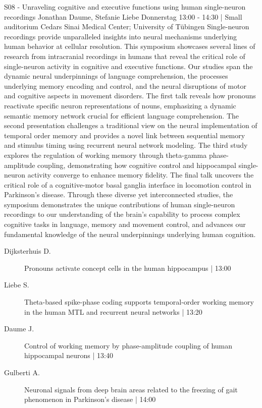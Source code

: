 
            \begin{symposium}
            {S08 - Unraveling cognitive and executive functions using human single-neuron recordings}
            {Jonathan Daume, Stefanie Liebe}
            {Donnerstag 13:00 - 14:30 | Small auditorium}
            {Cedars Sinai Medical Center; University of Tübingen}
            Single-neuron recordings provide unparalleled insights into neural mechanisms underlying human behavior at cellular resolution. This symposium showcases several lines of research from intracranial recordings in humans that reveal the critical role of single-neuron activity in cognitive and executive functions. Our studies span the dynamic neural underpinnings of language comprehension, the processes underlying memory encoding and control, and the neural disruptions of motor and cognitive aspects in movement disorders. The first talk reveals how pronouns reactivate specific neuron representations of nouns, emphasizing a dynamic semantic memory network crucial for efficient language comprehension. The second presentation challenges a traditional view on the neural implementation of temporal order memory and provides a novel link between sequential memory and stimulus timing using recurrent neural network modeling. The third study explores the regulation of working memory through theta-gamma phase-amplitude coupling, demonstrating how cognitive control and hippocampal single-neuron activity converge to enhance memory fidelity. The final talk uncovers the critical role of a cognitive-motor basal ganglia interface in locomotion control in Parkinson's disease. Through these diverse yet interconnected studies, the symposium demonstrates the unique contributions of human single-neuron recordings to our understanding of the brain's capability to process complex cognitive tasks in language, memory and movement control, and advances our fundamental knowledge of the neural underpinnings underlying human cognition.
            \begin{description}    
            
                \item [ Dijksterhuis D.] Pronouns activate concept cells in the human hippocampus \textcolor{mygray}{ | 13:00}    
                
                \item [ Liebe S.] Theta-based spike-phase coding supports temporal-order working memory in the human MTL and recurrent neural networks \textcolor{mygray}{ | 13:20}    
                
                \item [ Daume J.] Control of working memory by phase-amplitude coupling of human hippocampal neurons  \textcolor{mygray}{ | 13:40}    
                
                \item [ Gulberti A.] Neuronal signals from deep brain areas related to the freezing of gait phenomenon in Parkinson’s disease \textcolor{mygray}{ | 14:00}    
                
            \end{description} 
            \end{symposium}
            